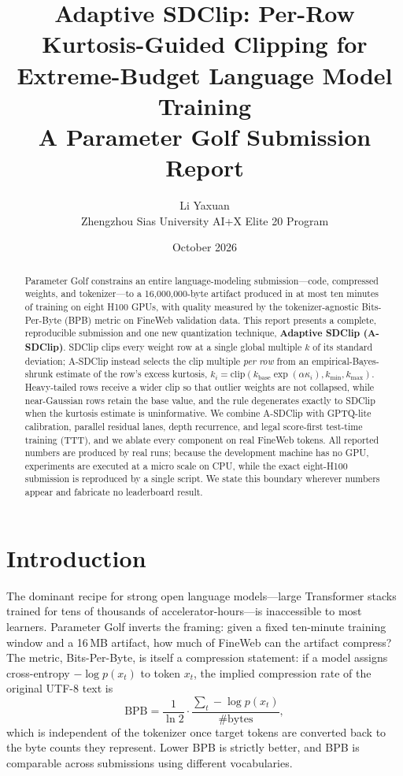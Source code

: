 \documentclass[10pt]{article}
\title{\textbf{Adaptive SDClip: Per-Row Kurtosis-Guided Clipping for\\
Extreme-Budget Language Model Training}\\[2pt]
\large A Parameter Golf Submission Report}
\author{Li Yaxuan\\
Zhengzhou Sias University \quad AI+X Elite 20 Program}
\date{October 2026}
\begin{document}
\maketitle

\begin{abstract}
Parameter Golf constrains an entire language-modeling submission---code, compressed
weights, and tokenizer---to a 16,000,000-byte artifact produced in at most ten
minutes of training on eight H100 GPUs, with quality measured by the tokenizer-agnostic
Bits-Per-Byte (BPB) metric on FineWeb validation data. This report presents a complete,
reproducible submission and one new quantization technique, \textbf{Adaptive SDClip
(A-SDClip)}. SDClip clips every weight row at a single global multiple $k$ of its
standard deviation; A-SDClip instead selects the clip multiple \emph{per row} from an
empirical-Bayes-shrunk estimate of the row's excess kurtosis,
$k_i=\mathrm{clip}(k_{\text{base}}\exp(\alpha\kappa_i),k_{\min},k_{\max})$. Heavy-tailed
rows receive a wider clip so that outlier weights are not collapsed, while near-Gaussian
rows retain the base value, and the rule degenerates exactly to SDClip when the kurtosis
estimate is uninformative. We combine A-SDClip with GPTQ-lite calibration, parallel
residual lanes, depth recurrence, and legal score-first test-time training (TTT), and we
ablate every component on real FineWeb tokens. All reported numbers are produced by real
runs; because the development machine has no GPU, experiments are executed at a
micro scale on CPU, while the exact eight-H100 submission is reproduced by a single
script. We state this boundary wherever numbers appear and fabricate no leaderboard
result.
\end{abstract}

\section{Introduction}

The dominant recipe for strong open language models---large Transformer
\citep{vaswani2017} stacks trained for tens of thousands of accelerator-hours---is
inaccessible to most learners. Parameter Golf inverts the framing: given a fixed
ten-minute training window and a 16\,MB artifact, how much of FineWeb can the artifact
compress? The metric, Bits-Per-Byte, is itself a compression statement: if a model
assigns cross-entropy $-\log p(x_t)$ to token $x_t$, the implied compression rate of the
original UTF-8 text is
\begin{equation}
\mathrm{BPB}=\frac{1}{\ln 2}\cdot
\frac{\sum_t -\log p(x_t)}{\#\text{bytes}},
\end{equation}
which is independent of the tokenizer once target tokens are converted back to the byte
counts they represent. Lower BPB is strictly better, and BPB is comparable across
submissions using different vocabularies.
\end{document}
